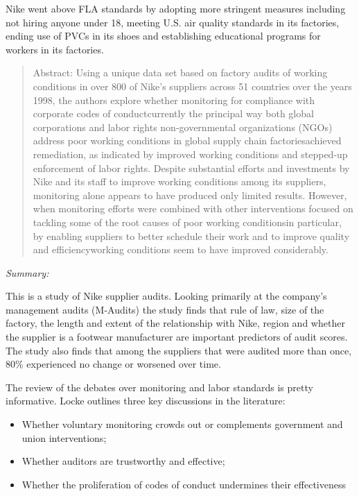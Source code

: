 \documentclass[
  12pt,
]{article}
\providecommand{\tightlist}{%
  \setlength{\itemsep}{0pt}\setlength{\parskip}{0pt}}
\begin{document}
Nike went above FLA standards by adopting more stringent measures
including not hiring anyone under 18, meeting U.S. air quality standards
in its factories, ending use of PVCs in its shoes and establishing
educational programs for workers in its factories.

\bigbreak


\begin{quote}
Abstract: 
Using a unique data set based on factory audits of working conditions in over 800 of Nike's suppliers across 51 countries over the years 1998, the authors explore whether monitoring for compliance with corporate codes of conduct\textemdash currently the principal way both global corporations and labor rights non-governmental organizations (NGOs) address poor working conditions in global supply chain factories\textemdash achieved remediation, as indicated by improved working conditions and stepped-up enforcement of labor rights. Despite substantial efforts and investments by Nike and its staff to improve working conditions among its suppliers, monitoring alone appears to have produced only limited results. However, when monitoring efforts were combined with other interventions focused on tackling some of the root causes of poor working conditions\textemdash in particular, by enabling suppliers to better schedule their work and to improve quality and efficiency\textemdash working conditions seem to have improved considerably.
\end{quote}

\emph{Summary:}

This is a study of Nike supplier audits. Looking primarily at the
company's management audits (M-Audits) the study finds that rule of law,
size of the factory, the length and extent of the relationship with
Nike, region and whether the supplier is a footwear manufacturer are
important predictors of audit scores. The study also finds that among
the suppliers that were audited more than once, 80\% experienced no
change or worsened over time.

The review of the debates over monitoring and labor standards is pretty
informative. Locke outlines three key discussions in the literature:

\begin{itemize}
\tightlist
\item
  Whether voluntary monitoring crowds out or complements government and
  union interventions;
\item
  Whether auditors are trustworthy and effective;
\item
  Whether the proliferation of codes of conduct undermines their
  effectiveness
\end{itemize}
\end{document}
